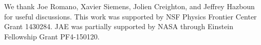 \documentclass[twocolumn,aps,prd,superscriptaddress]{revtex4-1}
\begin{document}
\acknowledgments
We thank Joe Romano, Xavier Siemens, Jolien Creighton, and Jeffrey Hazboun for useful discussions. 
This work was supported by NSF Physics Frontier Center Grant 1430284. 
JAE was partially supported by NASA through Einstein Fellowship Grant PF4-150120. 




\end{document}
